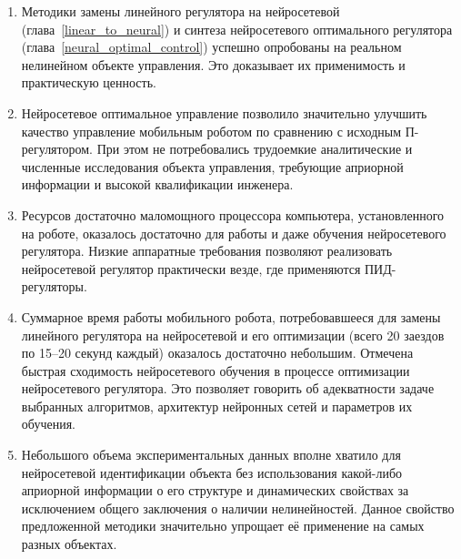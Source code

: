 \begin{enumerate}

\item Методики замены линейного регулятора на нейросетевой
(глава~\ref{linear_to_neural}) и синтеза нейросетевого оптимального
регулятора (глава~\ref{neural_optimal_control}) успешно опробованы на
реальном нелинейном объекте управления.  Это доказывает их
применимость и практическую ценность.

\item Нейросетевое оптимальное управление позволило значительно улучшить
качество управление мобильным роботом по сравнению с исходным
П-регулятором.  При этом не потребовались трудоемкие аналитические и
численные исследования объекта управления, требующие априорной
информации и высокой квалификации инженера.

\item Ресурсов достаточно маломощного процессора компьютера,
установленного на роботе, оказалось достаточно для работы и даже
обучения нейросетевого регулятора.  Низкие аппаратные требования
позволяют реализовать нейросетевой регулятор практически везде, где
применяются ПИД-регуляторы.

\item Суммарное время работы мобильного робота, потребовавшееся для
замены линейного регулятора на нейросетевой и его оптимизации (всего
20 заездов по 15--20 секунд каждый) оказалось достаточно небольшим.
Отмечена быстрая сходимость нейросетевого обучения в процессе
оптимизации нейросетевого регулятора.  Это позволяет говорить об
адекватности задаче выбранных алгоритмов, архитектур нейронных сетей и
параметров их обучения.

\item Небольшого объема экспериментальных данных вполне хватило для
нейросетевой идентификации объекта без использования какой-либо
априорной информации о его структуре и динамических свойствах за
исключением общего заключения о наличии нелинейностей.  Данное
свойство предложенной методики значительно упрощает её применение на
самых разных объектах.

\end{enumerate}

